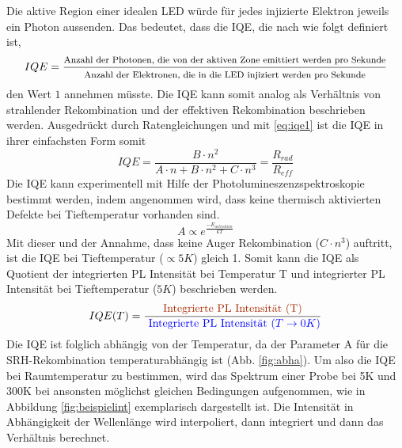 \noindent
Die aktive Region einer idealen LED würde für jedes injizierte Elektron jeweils ein Photon aussenden. 
Das bedeutet, dass die IQE, die nach \cite{schub} wie folgt definiert ist,
\begin{equation}
    IQE = \frac{ \footnotesize \text{Anzahl der Photonen, die von der aktiven Zone emittiert werden pro Sekunde}}{ \footnotesize \text{Anzahl der Elektronen, die in die LED injiziert werden pro Sekunde}}
\end{equation}
den Wert $1$ annehmen müsste. Die IQE kann somit analog als Verhältnis von strahlender Rekombination und der effektiven Rekombination beschrieben werden. Ausgedrückt durch Ratengleichungen und mit \ref{eq:iqe1} ist die IQE in ihrer einfachsten Form somit
\begin{equation}
    IQE = \frac{B \cdot n^2}{A \cdot n + B \cdot n^2 + C \cdot n^3} = \frac{R_{rad}}{R_{eff}}
\end{equation}
Die IQE kann experimentell mit Hilfe der Photolumineszenzspektroskopie bestimmt werden, indem angenommen wird, dass keine thermisch aktivierten Defekte bei Tieftemperatur vorhanden sind.
\begin{equation}
    A \propto e^{\frac{-E_{activation}}{kT}}
\end{equation}
Mit dieser und der Annahme, dass keine Auger Rekombination ($ C \cdot n^3 $) auftritt, ist die IQE bei Tieftemperatur ($ \propto 5K$) gleich 1. Somit kann die IQE als Quotient der integrierten PL Intensität bei Temperatur T und integrierter PL Intensität bei Tieftemperatur ($5K$) beschrieben werden.
\begin{equation}
    IQE(T) = \frac{\text{\textcolor[rgb]{0.65,0.16,0}{Integrierte PL Intensität (T)}}}{ \textcolor[rgb]{0,0,1}{\text{ Integrierte PL Intensität } (T \rightarrow 0 K)} }
    \label{eq:standardiqe}
\end{equation}
Die IQE ist folglich abhängig von der Temperatur, da der Parameter A für die SRH-Rekombination temperaturabhängig ist (Abb. \ref{fig:abha}). 
Um also die IQE bei Raumtemperatur zu bestimmen, wird das Spektrum einer Probe bei 5K und 300K bei ansonsten möglichst gleichen Bedingungen aufgenommen, wie in Abbildung \ref{fig:beispielint} exemplarisch dargestellt ist. Die Intensität in Abhängigkeit der Wellenlänge wird interpoliert, dann integriert und dann das Verhältnis berechnet. 
%